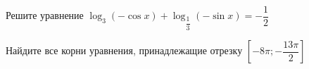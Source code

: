 \begin{ex}
	\begin{condition}
		\begin{enumcols}[label=\asbuk*)]
			\item Решите уравнение \( \log_3 (-\cos x )+\log_{\dfrac{1}{3}} (- \sin x)  = -\dfrac{1}{2} \)
			\item Найдите все корни уравнения, принадлежащие отрезку \( \left[-8\pi;-\dfrac{13\pi}{2}\right] \)
		\end{enumcols}
	\end{condition}
\end{ex}